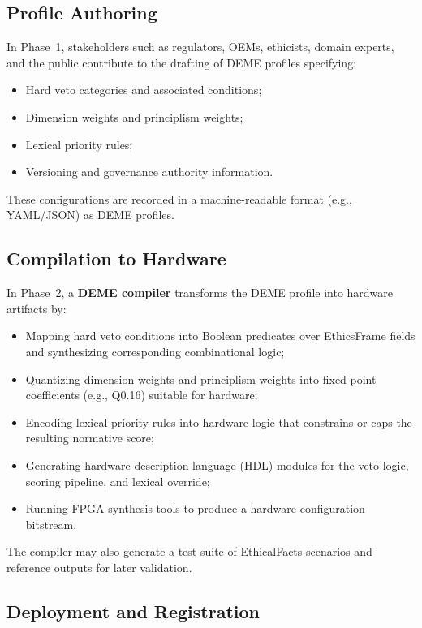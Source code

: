 \documentclass[11pt]{article}
\begin{document}
\subsection{Profile Authoring}

In Phase~1, stakeholders such as regulators, OEMs, ethicists, domain experts, and the public contribute to the drafting of DEME profiles specifying:

\begin{itemize}
  \item Hard veto categories and associated conditions;
  \item Dimension weights and principlism weights;
  \item Lexical priority rules;
  \item Versioning and governance authority information.
\end{itemize}

These configurations are recorded in a machine-readable format (e.g., YAML/JSON) as DEME profiles.

\subsection{Compilation to Hardware}

In Phase~2, a \textbf{DEME compiler} transforms the DEME profile into hardware artifacts by:

\begin{itemize}
  \item Mapping hard veto conditions into Boolean predicates over EthicsFrame fields and synthesizing corresponding combinational logic;
  \item Quantizing dimension weights and principlism weights into fixed-point coefficients (e.g., Q0.16) suitable for hardware;
  \item Encoding lexical priority rules into hardware logic that constrains or caps the resulting normative score;
  \item Generating hardware description language (HDL) modules for the veto logic, scoring pipeline, and lexical override;
  \item Running FPGA synthesis tools to produce a hardware configuration bitstream.
\end{itemize}

The compiler may also generate a test suite of EthicalFacts scenarios and reference outputs for later validation.

\subsection{Deployment and Registration}
\end{document}
